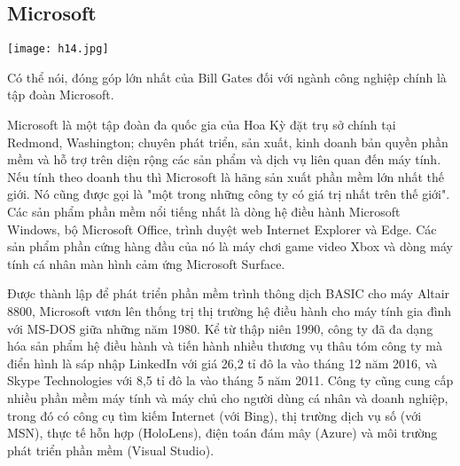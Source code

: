 \documentclass[12pt,a4paper]{article}  %
\begin{document}
\subsection{Microsoft}
\begin{center}
	\texttt{[image: h14.jpg]}
\end{center}
Có thể nói, đóng góp lớn nhất của Bill Gates đối với ngành công nghiệp chính là tập đoàn Microsoft.

\noindent Microsoft là một tập đoàn đa quốc gia của Hoa Kỳ đặt trụ sở chính tại Redmond, Washington; chuyên phát triển, sản xuất, kinh doanh bản quyền phần mềm và hỗ trợ trên diện rộng các sản phẩm và dịch vụ liên quan đến máy tính. Nếu tính theo doanh thu thì Microsoft là hãng sản xuất phần mềm lớn nhất thế giới. Nó cũng được gọi là "một trong những công ty có giá trị nhất trên thế giới". Các sản phẩm phần mềm nổi tiếng nhất là dòng hệ điều hành Microsoft Windows, bộ Microsoft Office, trình duyệt web Internet Explorer và Edge. Các sản phẩm phần cứng hàng đầu của nó là máy chơi game video Xbox và dòng máy tính cá nhân màn hình cảm ứng Microsoft Surface.

\noindent Được thành lập để phát triển phần mềm trình thông dịch BASIC cho máy Altair 8800, Microsoft vươn lên thống trị thị trường hệ điều hành cho máy tính gia đình với MS-DOS giữa những năm 1980. Kể từ thập niên 1990, công ty đã đa dạng hóa sản phẩm hệ điều hành và tiến hành nhiều thương vụ thâu tóm công ty mà điển hình là sáp nhập LinkedIn với giá 26,2 tỉ đô la vào tháng 12 năm 2016, và Skype Technologies với 8,5 tỉ đô la vào tháng 5 năm 2011. Công ty cũng cung cấp nhiều phần mềm máy tính và máy chủ cho người dùng cá nhân và doanh nghiệp, trong đó có công cụ tìm kiếm Internet (với Bing), thị trường dịch vụ số (với MSN), thực tế hỗn hợp (HoloLens), điện toán đám mây (Azure) và môi trường phát triển phần mềm (Visual Studio).
\end{document}
